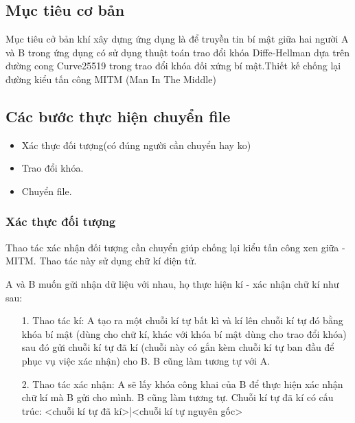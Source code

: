\documentclass[a4paper,12pt]{report}
\begin{document}
\subsection*{Mục tiêu cơ bản}
Mục tiêu cở bản khí xây dựng ứng dụng là để truyền tin bí mật giữa hai người A và B trong ứng dụng có sử dụng thuật toán trao đổi khóa Diffe-Hellman dựa trên đường cong Curve25519 trong trao đổi khóa đối xứng bí mật.Thiết kế chống lại đường kiểu tấn công MITM (Man In The Middle)
\subsection*{Các bước thực hiện chuyển file}
\begin{itemize}
\item Xác thực đối tượng(có đúng người cần chuyển hay ko)
\item Trao đổi khóa.
\item Chuyển file.
\end{itemize}
\subsubsection*{Xác thực đối tượng}
Thao tác xác nhận đối tượng cần chuyển giúp chống lại kiểu tấn công xen giữa - MITM.
Thao tác này sử dụng chữ kí điện tử.

A và B muốn gửi nhận dữ liệu với nhau, họ thực hiện kí - xác nhận chữ kí như sau:
\begin{itemize}
\item[1. ] Thao tác kí: A tạo ra một chuỗi kí tự bất kì và kí lên chuỗi kí tự đó bằng khóa bí mật (dùng cho chữ kí, khác với khóa bí mật dùng cho trao đổi khóa) sau đó gửi chuỗi kí tự đã kí (chuỗi này có gắn kèm chuỗi kí tự ban đầu để phục vụ việc xác nhận) cho B. B cũng làm tương tự với A.
\item[2. ] Thao tác xác nhận: A sẽ lấy khóa công khai của B để thực hiện xác nhận chữ kí mà B gửi cho mình. B cũng làm tương tự. Chuỗi kí tự đã kí có cấu trúc: <chuỗi kí tự đã kí>|<chuỗi kí tự nguyên gốc>
\end{itemize}
\end{document}

